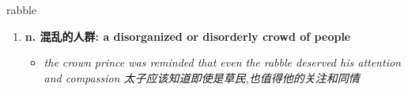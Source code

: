 
\begin{frame}
{\huge rabble}
\begin{center}
\begin{enumerate}\Large
  \item \textbf{n. 混乱的人群: a disorganized or disorderly crowd of people}
  \begin{itemize}
    \item \em{\Large{the crown prince was reminded that even the rabble deserved his attention and compassion 太子应该知道即使是草民,也值得他的关注和同情}}
  \end{itemize}
\end{enumerate}
\end{center}
\end{frame}
